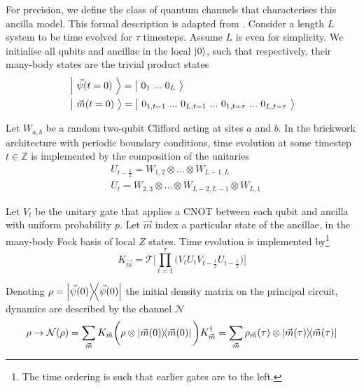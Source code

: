 \documentclass[10pt]{article}
\begin{document}
For precision, we define the class of quantum channels that characterises this ancilla model. This formal description is adapted from \cite{gullans2019scalable}. Consider a length $L$ system to be time evolved for $\tau$ timesteps. Assume $L$ is even for simplicity. We initialise all qubits and ancillae in the local $\ket{0}$, such that respectively, their many-body states are the trivial product states
\begin{align}
&\ket{\phantom{\big|}\vec{\psi}(t=0)\phantom{\big|}} 
= \ket{\phantom{\big|}0_1 \ ... \ 0_L\phantom{\big|}} \\
&\ket{\phantom{\big|}\vec{m}(t=0)\phantom{\big|}} 
= \ket{\phantom{\big|}0_{1,t=1} \ ... \ 0_{L,t=1} \ ... \ 0_{1,t=\tau} \ ... \ 0_{L,t=\tau} \phantom{\big|}}
\end{align}

Let $W_{a,b}$ be a random two-qubit Clifford acting at sites $a$ and $b$. In the brickwork architecture with periodic boundary conditions, time evolution at some timestep $t \in \mathbb{Z}$ is implemented by the composition of the unitaries
\begin{align}
&U_{t-\frac{1}{2}} =  W_{1,2} \otimes ... \otimes W_{L-1,L} \\
&U_{t} = W_{2,3} \otimes ... \otimes W_{L-2,L-1} \otimes W_{L,1}
\end{align}

Let $V_t$ be the unitary gate that applies a CNOT between each qubit and ancilla with uniform probability $p$. Let $\vec{m}$ index a particular state of the ancillae, in the many-body Fock basis of local $Z$ states. Time evolution is implemented by\footnote{The time ordering is such that earlier gates are to the left.}
\begin{equation}
K_{\vec{m}} = \mathcal{T} \bigg[ \prod_{t=1}^\tau \bigg(V_t U_t V_{t-\frac{1}{2}} U_{t-\frac{1}{2}}\bigg) \bigg]
\end{equation}

Denoting $\rho = \dyad{\vec{\psi}(0)}$ the initial density matrix on the principal circuit, dynamics are described by the channel $\mathcal{N}$
\begin{equation}
\rho \rightarrow
\mathcal{N}(\rho) 
= \sum_{\vec{m}} K_{\vec{m}} \bigg(\rho \otimes \dyad{\vec{m}(0)}\bigg) K_{\vec{m}}^\dagger 
= \sum_{\vec{m}} \rho_{\vec{m}} (\tau) \otimes \dyad{\vec{m}(\tau)}
\end{equation}
\end{document}
